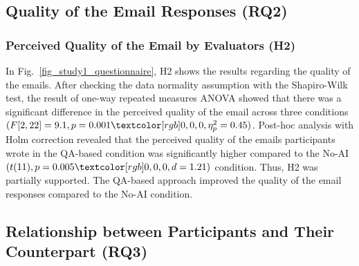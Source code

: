 \subsection{Quality of the Email Responses (RQ2)}
\label{sec:result1_RQ2}
\subsubsection{Perceived Quality of the Email by Evaluators (H2)}
\label{sec:result1_quality}
In Fig.~\ref{fig_study1_questionnaire}, H2 shows the results regarding the quality of the emails.
After checking the data normality assumption with the Shapiro-Wilk test, the result of one-way repeated measures ANOVA showed that there was a significant difference in the perceived quality of the email across three conditions $(F[2, 22]=9.1, p=0.001\red{, \eta_p^2=0.45})$. 
Post-hoc analysis with Holm correction revealed that the perceived quality of the emails participants wrote in the QA-based condition was significantly higher compared to the No-AI $(t(11), p=0.005\red{, d=1.21})$ condition.
Thus, H2 was partially supported.
The QA-based approach improved the quality of the email responses compared to the No-AI condition.




\subsection{Relationship between Participants and Their Counterpart (RQ3)}
\label{sec:result1_RQ3}
